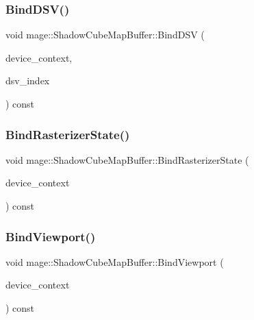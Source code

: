 \subsubsection{\texorpdfstring{Bind\+D\+S\+V()}{BindDSV()}}
{\footnotesize\ttfamily void mage\+::\+Shadow\+Cube\+Map\+Buffer\+::\+Bind\+D\+SV (\begin{DoxyParamCaption}\item[{I\+D3\+D11\+Device\+Context4 $\ast$}]{device\+\_\+context,  }\item[{size\+\_\+t}]{dsv\+\_\+index }\end{DoxyParamCaption}) const\hspace{0.3cm}{\ttfamily [noexcept]}}

\hypertarget{structmage_1_1_shadow_cube_map_buffer_ad47c740ba2246f965fb2021186bd11b8}{}\label{structmage_1_1_shadow_cube_map_buffer_ad47c740ba2246f965fb2021186bd11b8} 
\subsubsection{\texorpdfstring{Bind\+Rasterizer\+State()}{BindRasterizerState()}}
{\footnotesize\ttfamily void mage\+::\+Shadow\+Cube\+Map\+Buffer\+::\+Bind\+Rasterizer\+State (\begin{DoxyParamCaption}\item[{I\+D3\+D11\+Device\+Context4 $\ast$}]{device\+\_\+context }\end{DoxyParamCaption}) const\hspace{0.3cm}{\ttfamily [noexcept]}}

\hypertarget{structmage_1_1_shadow_cube_map_buffer_a0d3c49ed2d07dbe9d3e7efcc17416a70}{}\label{structmage_1_1_shadow_cube_map_buffer_a0d3c49ed2d07dbe9d3e7efcc17416a70} 
\subsubsection{\texorpdfstring{Bind\+Viewport()}{BindViewport()}}
{\footnotesize\ttfamily void mage\+::\+Shadow\+Cube\+Map\+Buffer\+::\+Bind\+Viewport (\begin{DoxyParamCaption}\item[{I\+D3\+D11\+Device\+Context4 $\ast$}]{device\+\_\+context }\end{DoxyParamCaption}) const\hspace{0.3cm}{\ttfamily [noexcept]}}

